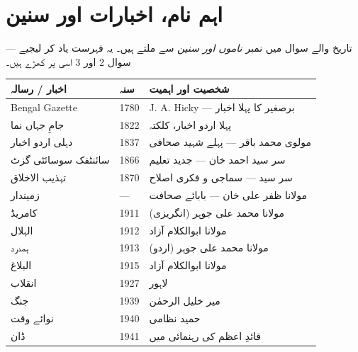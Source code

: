 
\section*{اہم نام، اخبارات اور سنین}

تاریخ والے سوال میں نمبر \emph{ناموں اور سنین} سے ملتے ہیں۔ یہ فہرست یاد کر
لیجیے --- سوال \textenglish{2} اور \textenglish{3} اسی پر کھڑے ہیں۔

\medskip
\begin{center}
\begin{tabular}{@{}p{4.2cm} p{2.4cm} p{7.8cm}@{}}
\toprule
\textbf{اخبار / رسالہ} & \textbf{سنہ} & \textbf{شخصیت اور اہمیت} \\
\midrule
\textenglish{Bengal Gazette} & \textenglish{1780} & \textenglish{J. A. Hicky} --- برصغیر کا پہلا اخبار \\
جامِ جہاں نما & \textenglish{1822} & پہلا اردو اخبار، کلکتہ \\
دہلی اردو اخبار & \textenglish{1837} & مولوی محمد باقر --- پہلے شہید صحافی \\
سائنٹفک سوسائٹی گزٹ & \textenglish{1866} & سر سید احمد خان --- جدید تعلیم \\
تہذیب الاخلاق & \textenglish{1870} & سر سید --- سماجی و فکری اصلاح \\
زمیندار & --- & مولانا ظفر علی خان --- بابائے صحافت \\
کامریڈ & \textenglish{1911} & مولانا محمد علی جوہر (انگریزی) \\
الہلال & \textenglish{1912} & مولانا ابوالکلام آزاد \\
ہمدرد & \textenglish{1913} & مولانا محمد علی جوہر (اردو) \\
البلاغ & \textenglish{1915} & مولانا ابوالکلام آزاد \\
انقلاب & \textenglish{1927} & لاہور \\
جنگ & \textenglish{1939} & میر خلیل الرحمٰن \\
نوائے وقت & \textenglish{1940} & حمید نظامی \\
ڈان & \textenglish{1941} & قائدِ اعظم کی رہنمائی میں \\
\bottomrule
\end{tabular}
\end{center}

